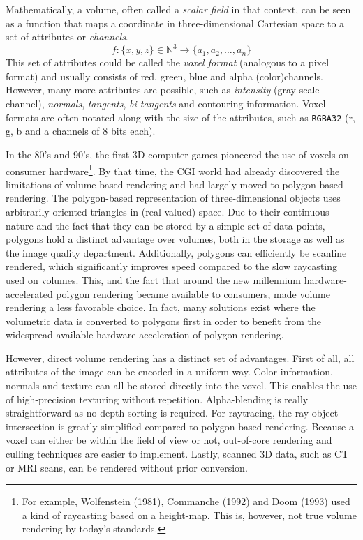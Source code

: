 Mathematically, a volume, often called a \emph{scalar field} in that context, can be seen as a function that maps a coordinate in three-dimensional Cartesian space to a set of attributes or \emph{channels}. 
$$ f \colon \{x,y,z\} \in \mathbb{N}^{3} \to \{a_1, a_2, \dotsc, a_n\} $$
This set of attributes could be called the \emph{voxel format} (analogous to a pixel format) and usually consists of red, green, blue and alpha (color)channels. However, many more attributes are possible, such as \emph{intensity} (gray-scale channel), \emph{normals}, \emph{tangents}, \emph{bi-tangents} and contouring information. Voxel formats are often notated along with the size of the attributes, such as \texttt{RGBA32} (r, g, b and a channels of 8 bits each).

In the 80's and 90's, the first 3D computer games pioneered the use of voxels on consumer hardware\footnote{For example, Wolfenstein (1981), Commanche (1992) and Doom (1993) used a kind of raycasting based on a height-map. This is, however, not true volume rendering by today's standards.}. By that time, the CGI world had already discovered the limitations of volume-based rendering and had largely moved to polygon-based rendering. The polygon-based representation of three-dimensional objects uses arbitrarily oriented triangles in (real-valued) space. Due to their continuous nature and the fact that they can be stored by a simple set of data points, polygons hold a distinct advantage over volumes, both in the storage as well as the image quality department. Additionally, polygons can efficiently be scanline rendered, which significantly improves speed compared to the slow raycasting used on volumes. This, and the fact that around the new millennium hardware-accelerated polygon rendering became available to consumers, made volume rendering a less favorable choice. In fact, many solutions exist where the volumetric data is converted to polygons first in order to benefit from the widespread available hardware acceleration of polygon rendering.

However, direct volume rendering has a distinct set of advantages. First of all, all attributes of the image can be encoded in a uniform way. Color information, normals and texture can all be stored directly into the voxel. This enables the use of high-precision texturing without repetition. Alpha-blending is really straightforward as no depth sorting is required. For raytracing, the ray-object intersection is greatly simplified compared to polygon-based rendering. Because a voxel can either be within the field of view or not, out-of-core rendering and culling techniques are easier to implement. Lastly, scanned 3D data, such as CT or MRI scans, can be rendered without prior conversion.

